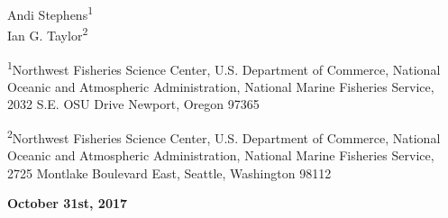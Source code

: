
\begin{center}
\thispagestyle{empty}


\vspace{.5cm}




Andi Stephens\textsuperscript{1}\\
Ian G. Taylor\textsuperscript{2}\\

\vspace{.5cm}

\small
\textsuperscript{1}Northwest Fisheries Science Center, U.S. Department of Commerce, National Oceanic and Atmospheric Administration, National Marine Fisheries Service, 2032 S.E. OSU Drive Newport, Oregon 97365\\

\vspace{.3cm}

\textsuperscript{2}Northwest Fisheries Science Center, U.S. Department of Commerce, National Oceanic and Atmospheric Administration, National Marine Fisheries Service, 2725 Montlake Boulevard East, Seattle, Washington 98112\\


\vspace{.5cm}

\vfill
\textbf{October 31st, 2017}\\
 

\vspace{.3cm}

\maketitle

\end{center}


